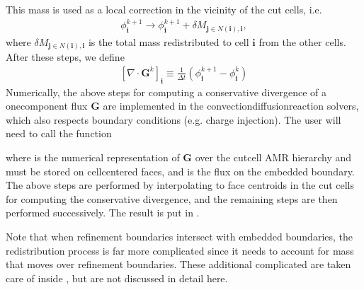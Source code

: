 \documentclass[letterpaper,10pt,english]{sphinxmanual}
\begin{document}
This mass is used as a local correction in the vicinity of the cut cells, i.e.
\begin{equation*}
\begin{split}\phi_{\mathbf{i}}^{k+1} \rightarrow \phi_{\mathbf{i}}^{k+1} + \delta M_{\mathbf{j}\in N(\mathbf{i}), \mathbf{i}},\end{split}
\end{equation*}
where \(\delta M_{\mathbf{j}\in N(\mathbf{i}), \mathbf{i}}\) is the total mass redistributed to cell \(\mathbf{i}\) from the other cells.
After these steps, we define
\begin{equation*}
\begin{split}\left[\nabla\cdot\mathbf{G}^k\right]_{\mathbf{i}} \equiv \frac{1}{\Delta t}\left(\phi_{\mathbf{i}}^{k+1} - \phi_{\mathbf{i}}^k\right)\end{split}
\end{equation*}
Numerically, the above steps for computing a conservative divergence of a one\sphinxhyphen{}component flux \(\mathbf{G}\) are implemented in the convection\sphinxhyphen{}diffusion\sphinxhyphen{}reaction solvers, which also respects boundary conditions (e.g. charge injection).
The user will need to call the function

\begin{sphinxVerbatim}[commandchars=\\\{\},formatcom=\scriptsize]
        
\end{sphinxVerbatim}

where  is the numerical representation of \(\mathbf{G}\) over the cut\sphinxhyphen{}cell AMR hierarchy and must be stored on cell\sphinxhyphen{}centered faces, and  is the flux on the embedded boundary.
The above steps are performed by interpolating  to face centroids in the cut cells for computing the conservative divergence, and the remaining steps are then performed successively.
The result is put in .

Note that when refinement boundaries intersect with embedded boundaries, the redistribution process is far more complicated since it needs to account for mass that moves over refinement boundaries.
These additional complicated are taken care of inside , but are not discussed in detail here.
\end{document}

